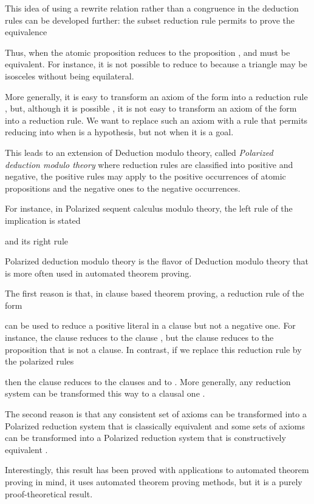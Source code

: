 \documentclass{llncs}
\begin{document}
This idea of using a rewrite relation rather than a congruence in the
deduction rules can be developed further: the subset reduction rule
permits to prove the equivalence

Thus, when the atomic proposition  reduces to the proposition 
,  and  must be equivalent.
For instance, it is not possible to reduce
 to  because a 
triangle may be isosceles without being equilateral.

More generally, it is easy to transform an axiom of the form 
 into a reduction rule , but, although 
it is possible \cite{BurelKirchner}, it is not 
easy to transform an axiom of the form 
 into a reduction rule. 
We want to replace such an axiom with a rule that permits reducing  into 
when  is a hypothesis, but not when it is a goal.

This leads to an extension of Deduction modulo theory, called {\em
Polarized deduction modulo theory} where reduction rules are
classified into positive and negative, the positive rules may apply to
the positive occurrences of atomic propositions and the negative ones to
the negative occurrences. 

For instance, in Polarized sequent calculus modulo theory, the left rule of the 
implication is stated 

and its right rule 


Polarized deduction modulo theory is the flavor of Deduction modulo theory 
that is more often used in automated theorem proving. 

The first reason is 
that, in clause based theorem proving, a reduction rule of the form 

can be used to reduce a positive literal in a clause 
but not a negative one.
For instance, the clause  reduces to 
the clause , 
but the clause  reduces to 
the proposition 
 that is not a clause. 
In contrast, if we replace this reduction rule by the polarized rules



then the clause  reduces to the clauses
 and to 
.
More generally, any reduction system can be transformed this way
to a clausal one \cite{Gao}.

The second reason is that any consistent set of axioms can be transformed 
into a Polarized reduction system that is classically equivalent 
\cite{stacs,Burel} and some sets of axioms can be transformed into 
a Polarized reduction system that is constructively equivalent 
\cite{Burel9}.

Interestingly, this result has been proved with applications
to automated theorem proving in mind, it uses automated theorem proving 
methods, but it is a purely proof-theoretical result.
\end{document}
